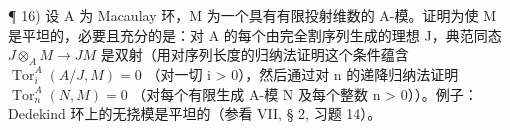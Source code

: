 ¶ 16) 设 A 为 Macaulay 环，M 为一个具有有限投射维数的 A-模。证明为使 M 是平坦的，必要且充分的是：对 A 的每个由完全割序列生成的理想 J，典范同态 \(J \otimes_{A} M \to JM\) 是双射（用对序列长度的归纳法证明这个条件蕴含 \(\operatorname{Tor}_{i}^{A}(A/J, M) = 0\) （对一切 i \textgreater{} 0），然后通过对 n 的递降归纳法证明 \(\operatorname{Tor}_{n}^{A}(N, M) = 0\) （对每个有限生成 A-模 N 及每个整数 n \textgreater{} 0））。例子：Dedekind 环上的无挠模是平坦的（参看 VII, § 2, 习题 14）。
